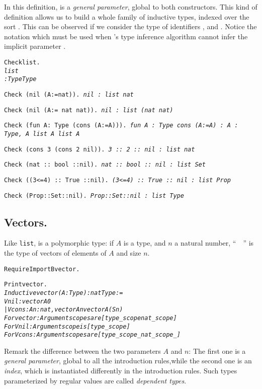 \documentclass[11pt]{article}
\begin{document}
In this definition,  is a \emph{general parameter}, global
to both constructors.
This kind of definition allows us to build a whole family of
inductive types, indexed over the sort .
This can be observed if we consider the type of identifiers
,  and .
Notice the notation  which must be used
when {\coq}'s type inference algorithm cannot infer the implicit
parameter .
\begin{alltt}
Check list.
\it list
     : Type {\arrow} Type

\tt Check (nil (A:=nat)).
\it nil
     : list nat

\tt Check (nil (A:= nat {\arrow} nat)).
\it nil
     : list (nat {\arrow} nat)

\tt Check (fun A: Type {\funarrow} (cons (A:=A))).
\it fun A : Type {\funarrow} cons (A:=A)
     : {\prodsym} A : Type, A {\arrow} list A {\arrow} list A

\tt Check (cons 3 (cons 2 nil)).
\it 3 :: 2 :: nil
     : list nat

\tt Check (nat :: bool ::nil).
\it nat :: bool :: nil
     : list Set

\tt Check ((3<=4) :: True ::nil).
\it (3<=4) :: True :: nil
     : list Prop

\tt Check (Prop::Set::nil).
\it Prop::Set::nil
     : list Type
\end{alltt}

\subsection{Vectors.}
\label{vectors}

Like \texttt{list},  is a polymorphic type:
if $A$ is a type, and $n$ a natural number, ``~~''
is the type of vectors of elements of $A$ and size $n$.


\begin{alltt}
Require Import  Bvector.

Print vector.
\it
Inductive vector (A : Type) : nat {\arrow} Type :=
    Vnil : vector A 0
  | Vcons : A {\arrow} {\prodsym} n : nat, vector A n {\arrow} vector A (S n)
For vector: Argument scopes are [type_scope nat_scope]
For Vnil: Argument scope is [type_scope]
For Vcons: Argument scopes are [type_scope _ nat_scope _]
\end{alltt}


Remark the difference between the two parameters $A$ and $n$:
The first one is a \textsl{general parameter}, global to all the
introduction rules,while the second one is an \textsl{index}, which is
instantiated differently in the introduction rules.
Such types parameterized  by regular
values are called \emph{dependent types}.
\end{document}
